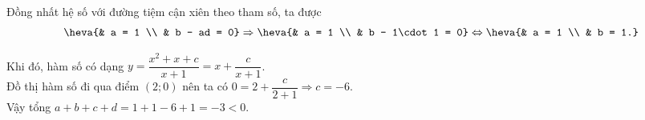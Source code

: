 \begin{ex}
{\begin{itemchoice}
\begin{itemize}
				\\ Đồng nhất hệ số với đường tiệm cận xiên theo tham số, ta được\\ 
				\[\heva{& a = 1 \\ & b - ad = 0} \Rightarrow \heva{& a = 1 \\ & b - 1\cdot 1 = 0} \Leftrightarrow \heva{& a = 1 \\ & b = 1.}\]
			\end{itemize}
			Khi đó, hàm số có dạng $y = \dfrac{x^2+x+c}{x+1} = x + \dfrac{c}{x+1}$.\\
			Đồ thị hàm số đi qua điểm $(2;0)$ nên ta có $0=2+\dfrac{c}{2+1}\Rightarrow c=-6$.\\
			Vậy tổng $a+b+c+d = 1+1-6+1 = -3 < 0$. 
		\end{itemchoice}
	}
\end{ex}

